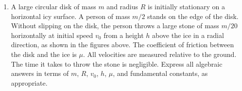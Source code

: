 \begin{enumerate}
%    
%

\item A large circular disk of mass $m$ and radius $R$ is initially stationary
  on a horizontal icy surface. A person of mass $m/2$ stands on the edge of the
  disk. Without slipping on the disk, the person throws a large stone of mass
  $m/20$ horizontally at initial speed $v_0$ from a height $h$ above the ice in
  a radial direction, as shown in the figures above. The coefficient of
  friction between the disk and the ice is $\mu$. All velocities are measured
  relative to the ground. The time it takes to throw the stone is negligible.
  Express all algebraic answers in terms of $m$, $R$, $v_0$, $h$, $\mu$, and
  fundamental constants, as appropriate.
%    
%    
%    

\end{enumerate}
